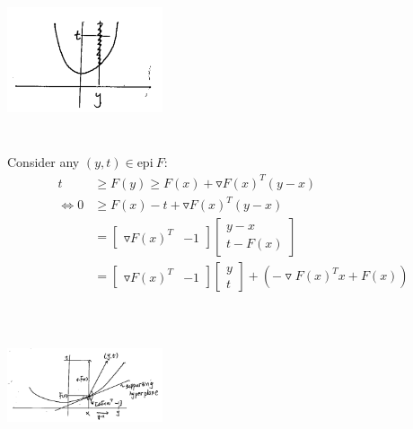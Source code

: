 \begin{marginfigure}
	\centering
	\includegraphics[width=1.8in,height=1.8in]{figures/ch08/figure1106_2.png}
\end{marginfigure}

Consider any $(y,t)\in \text{epi}\ F$:
\begin{align*}
t 
&\geq F(y) \geq F(x) + \triangledown F(x)^T(y-x)\\
\Leftrightarrow 0 &\geq F(x) - t + \triangledown F(x)^T(y-x)\\
&= 
\begin{bmatrix}
\triangledown F(x)^T & -1
\end{bmatrix}
\begin{bmatrix}
y-x\\
t -F(x)
\end{bmatrix}\\
&= 
\begin{bmatrix}
\triangledown F(x)^T  & -1
\end{bmatrix}
\begin{bmatrix}
y\\
t
\end{bmatrix} + (-\triangledown F(x)^Tx + F(x))
\end{align*}

\begin{marginfigure}
	\centering
	\includegraphics[width=1.8in,height=1.8in]{figures/ch08/figure1106_3.png}
\end{marginfigure}

